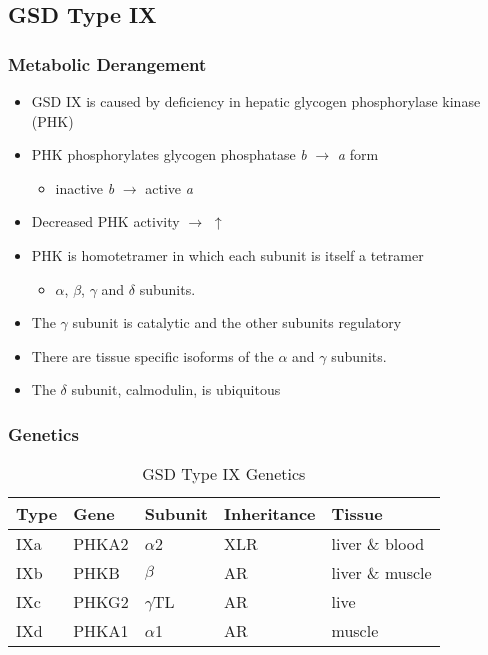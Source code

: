 \documentclass{scrartcl}
\begin{document}
\subsection{GSD Type IX}
\label{sec:orgfaa62db}
\subsubsection{Metabolic Derangement}
\label{sec:orgfaffeb6}
\begin{itemize}
\item GSD IX is caused by deficiency in hepatic glycogen phosphorylase kinase (PHK)
\item PHK phosphorylates glycogen phosphatase \emph{b} \(\to\) \emph{a} form
\begin{itemize}
\item inactive \emph{b} \(\to\)  active \emph{a}
\end{itemize}
\item Decreased PHK activity \(\to\) \(\uparrow\)
\item PHK is homotetramer in which each subunit is itself a tetramer
\begin{itemize}
\item \(\alpha\), \(\beta\), \(\gamma\) and \(\delta\) subunits.
\end{itemize}
\item The \(\gamma\) subunit is catalytic and the other subunits regulatory
\item There are tissue specific isoforms of the \(\alpha\) and \(\gamma\) subunits.
\item The \(\delta\) subunit, calmodulin, is ubiquitous
\end{itemize}

\subsubsection{Genetics}
\label{sec:org49113df}
\begin{table}[htbp]
\caption{\label{tab:org3622df3}
GSD Type IX Genetics}
\centering
\begin{tabular}{lllll}
Type & Gene & Subunit & Inheritance & Tissue\\
\hline
IXa & PHKA2 & \(\alpha\)2 & XLR & liver \& blood\\
IXb & PHKB & \(\beta\) & AR & liver \& muscle\\
IXc & PHKG2 & \(\gamma\)TL & AR & live\\
IXd & PHKA1 & \(\alpha\)1 & AR & muscle\\
\end{tabular}
\end{table}
\end{document}
